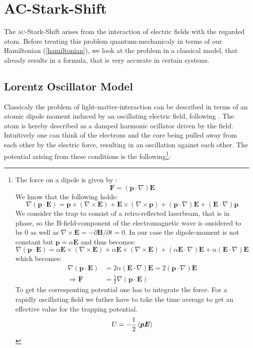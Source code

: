 \newpage
\newpage
\section{AC-Stark-Shift}
The \textsc{ac}-Stark-Shift arises from the interaction of electric fields with the regarded atom. Before treating this problem quantum-mechanicaly in terms of our Hamiltonian (\ref{hamiltonian}), we look at the problem in a classical model, that already results in a formula, that is very accurate in certain systems. 
\subsection{Lorentz Oscillator Model}

 Classicaly the problem of light-matter-interaction can be described in terms of an atomic dipole moment induced by an oscillating electric field, following \cite{dipole}. The atom is hereby described as a damped harmonic ocillator driven by the field. Intuitively one can think of the electrons and the core being pulled away from each other by the electric force, resulting in an oscillation against each other. The potential arising from these conditions is the following\footnote{The force on a dipole is given by \cite{factor}:
\begin{equation*}
\boldsymbol{F}=(\boldsymbol{p}\cdot\nabla)\boldsymbol{E}
\end{equation*}
We know that the following holds:
\begin{equation*}
\nabla(\boldsymbol{p}\cdot\boldsymbol{E})=\boldsymbol{p}\times(\nabla\times\boldsymbol{E})+\boldsymbol{E}\times(\nabla\times\boldsymbol{p})+(\boldsymbol{p}\cdot\nabla)\boldsymbol{E}+(\boldsymbol{E}\cdot\nabla)\boldsymbol{p}
\label{dipoleforce}\end{equation*}
We consider the trap to consist of a retro-reflected laserbeam, that is in phase, so the B-field-component of the electromagnetic wave is onsidered to be 0 as well as $\nabla\times\boldsymbol{E}=-\partial\boldsymbol{B}/\partial t=0$. In our case the dipole-moment is not constant but \(\boldsymbol{p}=\alpha \boldsymbol{E}\) and thus becomes:
\begin{equation*}
\nabla(\boldsymbol{p}\cdot\boldsymbol{E})=\alpha\boldsymbol{E}\times(\nabla\times\boldsymbol{E})+\alpha\boldsymbol{E}\times(\nabla\times\boldsymbol{E})+(\alpha\boldsymbol{E}\cdot\nabla)\boldsymbol{E}+\alpha(\boldsymbol{E}\cdot\nabla)\boldsymbol{E}
\end{equation*}
which becomes:
\begin{align*}
\nabla(\boldsymbol{p}\cdot\boldsymbol{E})&=2\alpha(\boldsymbol{E}\cdot\nabla)\boldsymbol{E}=2(\boldsymbol{p}\cdot\nabla)\boldsymbol{E}\\
\Rightarrow \boldsymbol{F}&=\frac{1}{2}\nabla(\boldsymbol{p}\cdot\boldsymbol{E})
\end{align*}
To get the corresponting potential one has to integrate the force. For a rapidly oscillating field we futher have to take the time average to get an effective value for the trapping potential.
\begin{equation*}
U=-\frac{1}{2}\left\langle \boldsymbol{p E}\right\rangle
\end{equation*}}:
